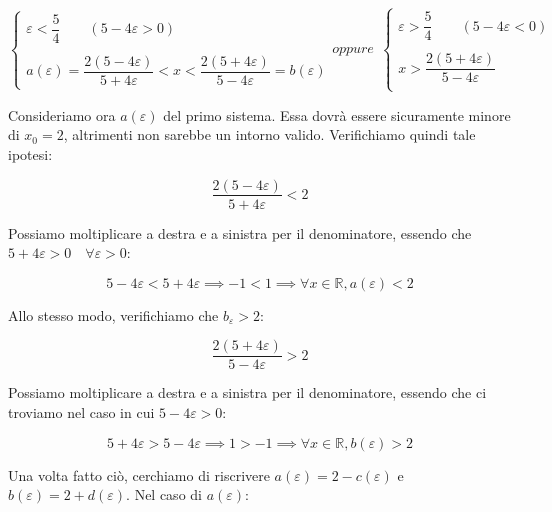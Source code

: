 \documentclass{article}
\begin{document}
\begin{equation*}
    \begin{cases}
        \varepsilon < \dfrac{5}{4} \qquad (5 - 4\varepsilon > 0) \\
        \\
        a(\varepsilon) = \dfrac{2(5-4\varepsilon)}{5 + 4\varepsilon} < x < \dfrac{2(5+4\varepsilon)}{5-4\varepsilon} = b(\varepsilon)
    \end{cases}
    oppure \ \
    \begin{cases}
        \varepsilon > \dfrac{5}{4} \qquad (5 - 4\varepsilon < 0) \\
        \\
        x > \dfrac{2(5 + 4\varepsilon)}{5 - 4\varepsilon} \\
    \end{cases}
\end{equation*}

\noindent Consideriamo ora $a(\varepsilon)$ del primo sistema. Essa dovrà essere sicuramente minore di $x_0 = 2$, altrimenti non sarebbe un intorno valido. Verifichiamo quindi tale ipotesi: 

\begin{equation*}
    \dfrac{2(5-4\varepsilon)}{5 + 4\varepsilon} < 2
\end{equation*}

\noindent Possiamo moltiplicare a destra e a sinistra per il denominatore, essendo che $5 + 4\varepsilon > 0 \quad \forall \varepsilon > 0$:

\begin{equation*}
    5-4\varepsilon < 5 + 4\varepsilon \implies -1 < 1 \implies \forall x \in \mathbb{R}, a(\varepsilon) < 2
\end{equation*}

\noindent Allo stesso modo, verifichiamo che $b_\varepsilon > 2$: 

\begin{equation*}
    \dfrac{2(5+4\varepsilon)}{5-4\varepsilon} > 2
\end{equation*}

\noindent Possiamo moltiplicare a destra e a sinistra per il denominatore, essendo che ci troviamo nel caso in cui $5 - 4\varepsilon > 0$:

\begin{equation*}
    5+4\varepsilon > 5 - 4\varepsilon \implies 1 > -1 \implies \forall x \in \mathbb{R}, b(\varepsilon) > 2
\end{equation*}

\noindent Una volta fatto ciò, cerchiamo di riscrivere $a(\varepsilon) = 2 - c(\varepsilon)$ e $b(\varepsilon) = 2 + d(\varepsilon)$. Nel caso di $a(\varepsilon)$:
\end{document}
